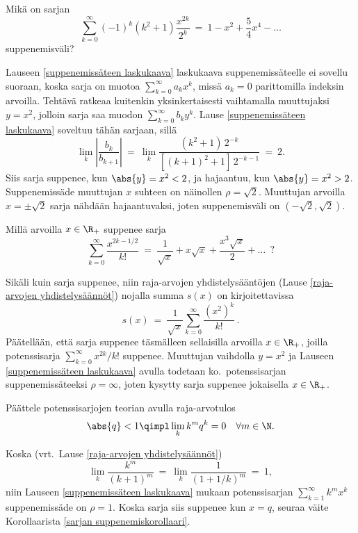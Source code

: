 \begin{Exa} Mikä on sarjan
\[
\sum_{k=0}^\infty (-1)^k (k^2+1) \dfrac{x^{2k}}{2^k}\ =\ 1 - x^2 + \dfrac{5}{4} x^4 - \ldots
\]
suppenemisväli? 
\end{Exa}
\ratk Lauseen \ref{suppenemissäteen laskukaava} laskukaava suppenemissäteelle ei sovellu 
suoraan, koska sarja on muotoa $\sum_{k=0}^\infty a_k x^k$, missä $a_k = 0$ parittomilla 
indeksin arvoilla. Tehtävä ratkeaa kuitenkin yksinkertaisesti vaihtamalla muuttujaksi $y=x^2$,
jolloin sarja saa muodon $\sum_{k=0}^\infty b_k y^k$. Lause \ref{suppenemissäteen laskukaava}
soveltuu tähän sarjaan, sillä
\[
\lim_k \left|\dfrac{b_k}{b_{k+1}}\right|\ 
               =\ \lim_k \dfrac{(k^2 +1)\,2^{-k}}{[(k+1)^2 + 1]\,2^{-k-1}}\ =\ 2.
\]
Siis sarja suppenee, kun $\abs{y} = x^2 < 2$, ja hajaantuu, kun $\abs{y} = x^2 > 2$. 
Suppenemissäde muuttujan $x$ suhteen on näinollen $\rho = \sqrt{2}$. Muuttujan arvoilla 
$x=\pm\sqrt{2}$ sarja nähdään hajaantuvaksi, joten suppenemisväli on $(-\sqrt{2},\sqrt{2})$.
\loppu
\begin{Exa} Millä arvoilla $x \in \R_+$ suppenee sarja 
\[ 
\sum_{k=0}^\infty \dfrac{x^{2k-1/2}}{k!}\ 
          =\ \dfrac{1}{\sqrt{x}} + x\sqrt{x} + \dfrac{x^3\sqrt{x}}{2} + \ldots \ \ ?
\]
\end{Exa}
\ratk Sikäli kuin sarja suppenee, niin raja-arvojen yhdistelysääntöjen 
(Lause \ref{raja-arvojen yhdistelysäännöt}) nojalla summa $s(x)$ on kirjoitettavissa
\[
s(x)\ =\ \dfrac{1}{\sqrt{x}} \sum_{k=0}^\infty \dfrac{(x^2)^k}{k!}\,.
\]
Päätellään, että sarja suppenee täsmälleen sellaisilla arvoilla $x\in\R_+$, joilla potenssisarja
$\sum_{k=0}^\infty x^{2k}/k!$ suppenee. Muuttujan vaihdolla $y=x^2$ ja Lauseen 
\ref{suppenemissäteen laskukaava} avulla todetaan ko.\ potenssisarjan suppenemissäteeksi 
$\rho = \infty$, joten kysytty sarja suppenee jokaisella $x \in \R_+$. \loppu
\begin{Exa} \label{potenssilimes ja potenssisarja} Päättele potenssisarjojen teorian avulla 
raja-arvotulos
\[ \abs{q} < 1 \qimpl \lim_k k^m q^k = 0\ \ \ \forall m \in \N. \] 
\end{Exa}
\ratk Koska (vrt.\ Lause \ref{raja-arvojen yhdistelysäännöt})
\[
\lim_k \dfrac{k^m}{(k+1)^m}\ =\ \lim_k \dfrac{1}{(1+1/k)^m}\ =\ 1,
\]
niin Lauseen \ref{suppenemissäteen laskukaava} mukaan potenssisarjan 
$\sum_{k=1}^\infty k^m x^k$ suppenemissäde on $\rho = 1$. Koska sarja siis suppenee kun $x=q$,
seuraa väite Korollaarista \ref{sarjan suppenemiskorollaari}. \loppu

